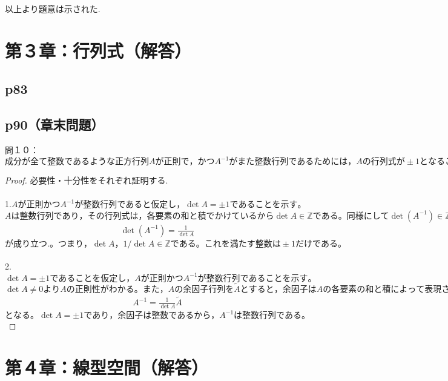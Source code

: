 \documentclass[dvipdfmx,uplatex,11pt]{jsarticle}
\begin{document}
以上より題意は示された.
%
%
%
\newpage
%
%
%
\section{第３章：行列式（解答）}
\subsection{p83}
%
%
%
\newpage
%
%
%
\subsection{p90（章末問題）}
問１０：$成分が全て整数であるような正方行列Aが正則で，かつA^{−1}がまた整数行列であるためには，Aの行列式が\pm 1となることが必要かつ十分であることを示せ.$
\begin{leftbar}
\begin{proof}
必要性・十分性をそれぞれ証明する.\\ \\
1.$Aが正則かつA^{−1}が整数行列であると仮定し，\det A=\pm 1であることを示す。$\\
$Aは整数行列であり，その行列式は，各要素の和と積でかけているから\det A \in \mathbb{Z}である。同様にして\det (A^{−1}) \in \mathbb{Z}である。逆行列の行列式は，$
\begin{eqnarray*}
\det (A^{−1})=\frac{1}{\det A}
\end{eqnarray*}
$が成り立つ.。つまり，\det A，1/\det A \in \mathbb{Z} である。これを満たす整数は\pm 1だけである。$\\
\\
2.$\det A=\pm 1であることを仮定し，Aが正則かつA^{−1}が整数行列であることを示す。$\\
$\det A \neq 0 より A の正則性がわかる。また，Aの余因子行列を\tilde{A}とすると，余因子はAの各要素の和と積によって表現される。つまり，余因子は整数であるから\tilde{A}は整数行列である. また$
\begin{eqnarray*}
A^{−1}=\frac{1}{\det A}\tilde{A}
\end{eqnarray*}
$となる。\det A=\pm 1であり， 余因子は整数であるから，A^{−1}は整数行列である。$
\end{proof}
\end{leftbar}
%
%
%
\newpage
%
%
%
\section{第４章：線型空間（解答）}
\end{document}
